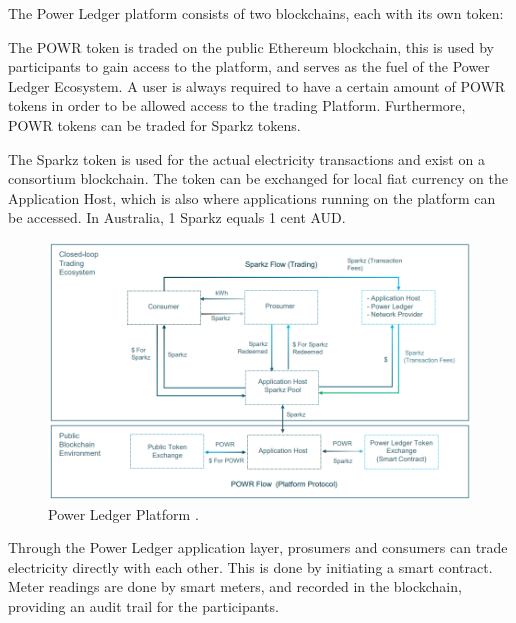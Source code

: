 The Power Ledger platform consists of two blockchains, each with its own token:

The POWR token is traded on the public Ethereum blockchain, this is used by participants to gain access to the platform, and serves as the fuel of the Power Ledger Ecosystem. A user is always required to have a certain amount of POWR tokens in order to be allowed access to the trading Platform. Furthermore, POWR tokens can be traded for Sparkz tokens.

The Sparkz token is used for the actual electricity transactions and exist on a consortium blockchain. The token can be exchanged for local fiat currency on the Application Host, which is also where applications running on the platform can be accessed. In Australia, 1 Sparkz equals 1 cent AUD.


\begin{figure}[htb]
    \centering
    \includegraphics[width=1\textwidth]{Images/pl}
    \caption{Power Ledger Platform \cite{pl_home}.}
    \label{fig:pl}
\end{figure}

Through the Power Ledger application layer, prosumers and consumers can trade electricity directly with each other. This is done by initiating a smart contract. Meter readings are done by smart meters, and recorded in the blockchain, providing an audit trail for the participants. 

